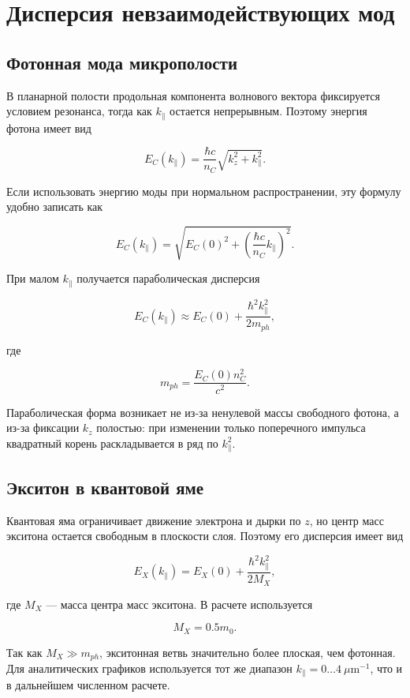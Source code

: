 \documentclass[12pt,a4paper]{article}
\begin{document}
\clearpage
\section{Дисперсия невзаимодействующих мод}

\subsection{Фотонная мода микрополости}

В планарной полости продольная компонента волнового вектора фиксируется условием резонанса, тогда как $k_\parallel$ остается непрерывным. Поэтому энергия фотона имеет вид

\[
E_C(k_\parallel)
=
\frac{\hbar c}{n_C}
\sqrt{k_z^2+k_\parallel^2}.
\]

Если использовать энергию моды при нормальном распространении, эту формулу удобно записать как

\[
E_C(k_\parallel)
=
\sqrt{
E_C(0)^2+
\left(\frac{\hbar c}{n_C}k_\parallel\right)^2
}.
\]

При малом $k_\parallel$ получается параболическая дисперсия

\[
E_C(k_\parallel)
\approx
E_C(0)+\frac{\hbar^2k_\parallel^2}{2m_{ph}},
\]

где

\[
m_{ph}=\frac{E_C(0)n_C^2}{c^2}.
\]

Параболическая форма возникает не из-за ненулевой массы свободного фотона, а из-за фиксации $k_z$ полостью: при изменении только поперечного импульса квадратный корень раскладывается в ряд по $k_\parallel^2$.

\subsection{Экситон в квантовой яме}

Квантовая яма ограничивает движение электрона и дырки по $z$, но центр масс экситона остается свободным в плоскости слоя. Поэтому его дисперсия имеет вид

\[
E_X(k_\parallel)
=
E_X(0)+\frac{\hbar^2k_\parallel^2}{2M_X},
\]

где $M_X$ --- масса центра масс экситона. В расчете используется

\[
M_X=0.5m_0.
\]

Так как $M_X\gg m_{ph}$, экситонная ветвь значительно более плоская, чем фотонная. Для аналитических графиков используется тот же диапазон $k_\parallel=0\ldots4\ \mu\mathrm m^{-1}$, что и в дальнейшем численном расчете.
\end{document}
